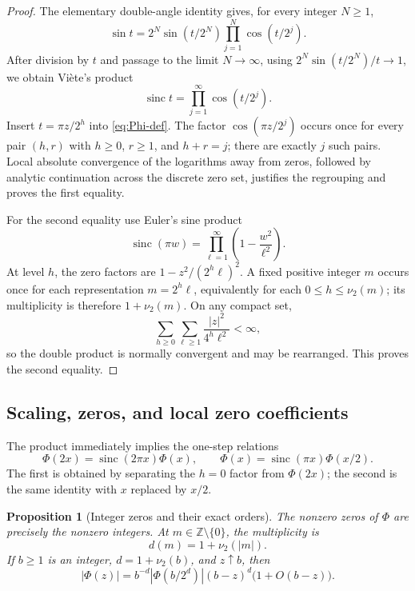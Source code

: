 \documentclass[11pt,oneside]{article}
\numberwithin{equation}{section}
\newtheorem{proposition}[theorem]{Proposition}
\theoremstyle{definition}
\theoremstyle{remark}
\newcommand{\Z}{\mathbb Z}
\newcommand{\abs}[1]{\left|#1\right|}
\newcommand{\sinc}{\operatorname{sinc}}
\newcommand{\PhiUp}{\Phi}
\newcommand{\nuTwo}{\nu_2}
\begin{document}
\begin{proof}
The elementary double-angle identity gives, for every integer \(N\ge1\),
\[
 \sin t=2^N\sin(t/2^N)\prod_{j=1}^{N}\cos(t/2^j).
\]
After division by \(t\) and passage to the limit \(N\to\infty\), using
\(2^N\sin(t/2^N)/t\to1\), we obtain Vi\`ete's product
\[
 \sinc t=\prod_{j=1}^{\infty}\cos(t/2^j).
\]
Insert \(t=\pi z/2^h\) into \eqref{eq:Phi-def}.  The factor
\(\cos(\pi z/2^j)\) occurs once for every pair \((h,r)\) with \(h\ge0\), \(r\ge1\), and
\(h+r=j\); there are exactly \(j\) such pairs.  Local absolute convergence of the
logarithms away from zeros, followed by analytic continuation across the discrete zero set,
justifies the regrouping and proves the first equality.

For the second equality use Euler's sine product
\[
 \sinc(\pi w)=\prod_{\ell=1}^{\infty}\left(1-\frac{w^2}{\ell^2}\right).
\]
At level \(h\), the zero factors are
\(1-z^2/(2^h\ell)^2\).  A fixed positive integer \(m\) occurs once for each representation
\(m=2^h\ell\), equivalently for each \(0\le h\le\nuTwo(m)\); its multiplicity is therefore
\(1+\nuTwo(m)\).  On any compact set,
\[
 \sum_{h\ge0}\sum_{\ell\ge1}\frac{\abs z^2}{4^h\ell^2}<\infty,
\]
so the double product is normally convergent and may be rearranged.  This proves the second
equality.
\end{proof}

\subsection{Scaling, zeros, and local zero coefficients}

The product immediately implies the one-step relations
\begin{equation}
 \PhiUp(2x)=\sinc(2\pi x)\PhiUp(x),
 \qquad
 \PhiUp(x)=\sinc(\pi x)\PhiUp(x/2).
 \label{eq:one-step}
\end{equation}
The first is obtained by separating the \(h=0\) factor from \(\PhiUp(2x)\); the second is
the same identity with \(x\) replaced by \(x/2\).

\begin{proposition}[Integer zeros and their exact orders]
\label{prop:zeros}
The nonzero zeros of \(\PhiUp\) are precisely the nonzero integers.  At
\(m\in\Z\setminus\{0\}\), the multiplicity is
\begin{equation}
 d(m)=1+\nuTwo(\abs m).
 \label{eq:zero-order}
\end{equation}
If \(b\ge1\) is an integer, \(d=1+\nuTwo(b)\), and \(z\uparrow b\), then
\begin{equation}
 \abs{\PhiUp(z)}
 =b^{-d}\abs{\PhiUp(b/2^d)}(b-z)^d\bigl(1+O(b-z)\bigr).
 \label{eq:local-zero}
\end{equation}
\end{proposition}
\end{document}
